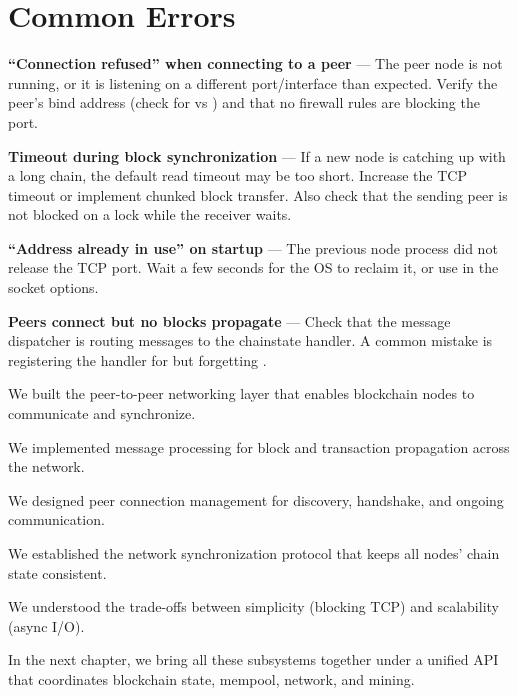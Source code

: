 \section{Common Errors}
\label{sec:ch12-common-errors}

\begin{notebox}
\textbf{``Connection refused'' when connecting to a peer} --- The peer node is not running, or it is listening on a different port/interface than expected. Verify the peer's bind address (check for  vs ) and that no firewall rules are blocking the port.

\textbf{Timeout during block synchronization} --- If a new node is catching up with a long chain, the default read timeout may be too short. Increase the TCP timeout or implement chunked block transfer. Also check that the sending peer is not blocked on a lock while the receiver waits.

\textbf{``Address already in use'' on startup} --- The previous node process did not release the TCP port. Wait a few seconds for the OS to reclaim it, or use  in the socket options.

\textbf{Peers connect but no blocks propagate} --- Check that the message dispatcher is routing  messages to the chainstate handler. A common mistake is registering the handler for  but forgetting .
\end{notebox}

\begin{chaptersummary}
\item We built the peer-to-peer networking layer that enables blockchain nodes to communicate and synchronize.
\item We implemented message processing for block and transaction propagation across the network.
\item We designed peer connection management for discovery, handshake, and ongoing communication.
\item We established the network synchronization protocol that keeps all nodes' chain state consistent.
\item We understood the trade-offs between simplicity (blocking TCP) and scalability (async I/O).
\end{chaptersummary}

In the next chapter, we bring all these subsystems together under a unified  API that coordinates blockchain state, mempool, network, and mining.
